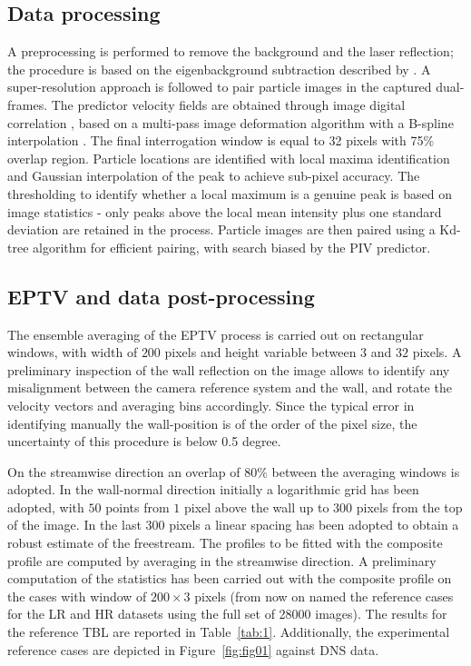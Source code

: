 \subsection{Data processing}
A preprocessing is performed to remove the background and the laser reflection; the procedure is based on the eigenbackground subtraction described by \citet{Mendez2017181}. A super-resolution approach \citep{keane1995super} is followed to pair particle images in the captured dual-frames. The predictor velocity fields are obtained through image digital correlation \citep{willert1991digital}, based on a multi-pass \citep{soria1996investigation} image deformation algorithm \citep{scarano2001iterative} with a B-spline interpolation \citep{Astarita2005}. The final interrogation window is equal to 32 pixels with 75\% overlap region. Particle locations are identified with local maxima identification and Gaussian interpolation of the peak to achieve sub-pixel accuracy. The thresholding to identify whether a local maximum is a genuine peak is based on image statistics - only peaks above the local mean intensity plus one standard deviation are retained in the process. Particle images are then paired using a Kd-tree algorithm \citep{Tagliasacchi2021} for efficient pairing, with search biased by the PIV predictor. 

\subsection{EPTV and data post-processing} \label{ss:EPTV}
The ensemble averaging of the EPTV process is carried out on rectangular windows, with width of $200$ pixels and height variable between $3$ and $32$ pixels. A preliminary inspection of the wall reflection on the image allows to identify any misalignment between the camera reference system and the wall, and rotate the velocity vectors and averaging bins accordingly. Since the typical error in identifying manually the wall-position is of the order of the pixel size, the uncertainty of this procedure is below 0.5 degree.

On the streamwise direction an overlap of $80\%$ between the averaging windows is adopted. In the wall-normal direction initially a logarithmic grid has been adopted, with $50$ points from $1$ pixel above the wall up to $300$ pixels from the top of the image. In the last $300$ pixels a linear spacing has been adopted to obtain a robust estimate of the freestream. The profiles to be fitted with the composite profile are computed by averaging in the streamwise direction. A preliminary computation of the statistics has been carried out with the composite profile on the cases with window of $200\times3$ pixels (from now on named the reference cases for the LR and HR datasets using the full set of 28000 images). The results for the reference TBL are reported in Table~\ref{tab:1}. Additionally, the experimental reference cases are depicted in Figure~\ref{fig:fig01} against DNS data. 

